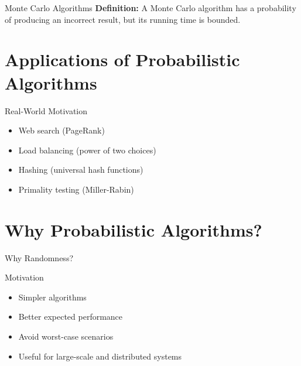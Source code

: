 \documentclass[aspectratio=169]{beamer}
\begin{document}
\begin{frame}{Monte Carlo Algorithms}
  \textbf{Definition:} A Monte Carlo algorithm has a probability of producing an incorrect result, but its running time is bounded. \parencite{MonteCarloError1991}
\end{frame}

\section{Applications of Probabilistic Algorithms}

\begin{frame}{Real-World Motivation}
  \begin{itemize}
    \item Web search (PageRank)
    \item Load balancing (power of two choices)
    \item Hashing (universal hash functions)
    \item Primality testing (Miller-Rabin)
  \end{itemize}
\end{frame}

\section{Why Probabilistic Algorithms?}
\begin{frame}{Why Randomness?}
  \begin{block}{Motivation}
    \begin{itemize}
      \item Simpler algorithms

      \item Better expected performance

      \item Avoid worst-case scenarios

      \item Useful for large-scale and distributed systems
    \end{itemize}
  \end{block}
\end{frame}

\end{document}
